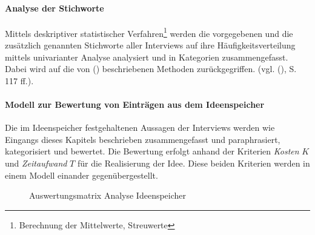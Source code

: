 \documentclass[../../main.tex]{subfiles}
\begin{document}
\paragraph*{Analyse der Stichworte}\mbox{}

\begin{sloppypar}
Mittels deskriptiver statistischer Verfahren\footnote{Berechnung der Mittelwerte, Streuwerte} werden die vorgegebenen und die zusätzlich genannten Stichworte aller Interviews auf ihre Häufigkeitsverteilung mittels univarianter Analyse analysiert und in Kategorien zusammengefasst. Dabei wird auf die von \citeauthor{mayer_interview_2013} (\citeyear{mayer_interview_2013}) beschriebenen Methoden zurückgegriffen. (vgl. \citeauthor{mayer_interview_2013} (\citeyear{mayer_interview_2013}), S. 117 ff.).
\end{sloppypar}

\paragraph*{Modell zur Bewertung von Einträgen aus dem Ideenspeicher}\mbox{}
\label{modell_bewertung_ideenspeicher}

\begin{sloppypar}
Die im Ideenspeicher festgehaltenen Aussagen der Interviews werden wie Eingangs dieses Kapitels beschrieben zusammengefasst und paraphrasiert, kategorisiert und bewertet. Die Bewertung erfolgt anhand der Kriterien \textit{Kosten} $K$ und \textit{Zeitaufwand} $T$ für die Realisierung der Idee. Diese beiden Kriterien werden in einem Modell einander gegenübergestellt.
\end{sloppypar}

\begin{figure}[H]
 \centering
    
 \caption{Auswertungsmatrix Analyse Ideenspeicher}
 \label{Auswertungsmatrix Ideenspeicher-Analyse}
\end{figure}
\end{document}

